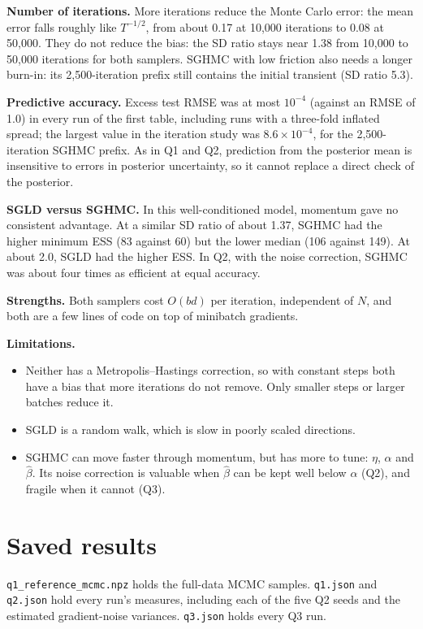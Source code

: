 \documentclass[11pt]{article}
\begin{document}
\textbf{Number of iterations.} More iterations reduce the Monte Carlo error: the mean error falls roughly
like $T^{-1/2}$, from about 0.17 at 10,000 iterations to 0.08 at 50,000. They do not reduce the bias: the SD
ratio stays near 1.38 from 10,000 to 50,000 iterations for both samplers. SGHMC with low friction also needs a
longer burn-in: its 2,500-iteration prefix still contains the initial transient (SD ratio 5.3).

\textbf{Predictive accuracy.} Excess test RMSE was at most $10^{-4}$ (against an RMSE of 1.0) in every run of
the first table, including runs with a three-fold inflated spread; the largest value in the iteration study
was $8.6\times10^{-4}$, for the 2,500-iteration SGHMC prefix. As in Q1 and Q2, prediction from the posterior mean is
insensitive to errors in posterior uncertainty, so it cannot replace a direct check of the posterior.

\textbf{SGLD versus SGHMC.} In this well-conditioned model, momentum gave no consistent advantage. At a
similar SD ratio of about 1.37, SGHMC had the higher minimum ESS (83 against 60) but the lower median (106
against 149). At about 2.0, SGLD had the higher ESS. In Q2, with the noise correction, SGHMC was about four
times as efficient at equal accuracy.

\textbf{Strengths.} Both samplers cost $O(bd)$ per iteration, independent of $N$, and both are a few lines
of code on top of minibatch gradients.

\textbf{Limitations.}
\begin{itemize}
\item Neither has a Metropolis--Hastings correction, so with constant steps both have a bias that more
iterations do not remove. Only smaller steps or larger batches reduce it.
\item SGLD is a random walk, which is slow in poorly scaled directions.
\item SGHMC can move faster through momentum, but has more to tune: $\eta$, $\alpha$ and $\hat\beta$. Its
noise correction is valuable when $\hat\beta$ can be kept well below $\alpha$ (Q2), and fragile when it
cannot (Q3).
\end{itemize}

\newpage
\section*{Saved results}

\texttt{q1\_reference\_mcmc.npz} holds the full-data MCMC samples. \texttt{q1.json} and \texttt{q2.json} hold
every run's measures, including each of the five Q2 seeds and the estimated gradient-noise variances.
\texttt{q3.json} holds every Q3 run.
\end{document}
